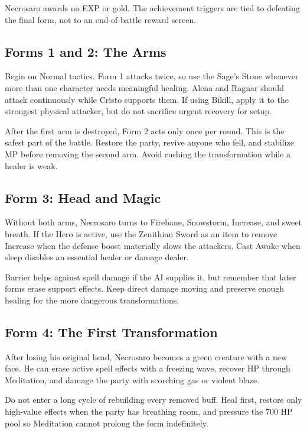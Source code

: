 \documentclass[
  american,
  10pt,
  letterpaper,
  oneside,
  open=any]{scrreprt}
\begin{document}
Necrosaro awards no EXP or gold. The achievement triggers are tied to
defeating the final form, not to an end-of-battle reward screen.

\subsection{Forms 1 and 2: The Arms}\label{forms-1-and-2-the-arms}

Begin on Normal tactics. Form 1 attacks twice, so use the Sage's Stone
whenever more than one character needs meaningful healing. Alena and
Ragnar should attack continuously while Cristo supports them. If using
Bikill, apply it to the strongest physical attacker, but do not
sacrifice urgent recovery for setup.

After the first arm is destroyed, Form 2 acts only once per round. This
is the safest part of the battle. Restore the party, revive anyone who
fell, and stabilize MP before removing the second arm. Avoid rushing the
transformation while a healer is weak.

\subsection{Form 3: Head and Magic}\label{form-3-head-and-magic}

Without both arms, Necrosaro turns to Firebane, Snowstorm, Increase, and
sweet breath. If the Hero is active, use the Zenithian Sword as an item
to remove Increase when the defense boost materially slows the
attackers. Cast Awake when sleep disables an essential healer or damage
dealer.

Barrier helps against spell damage if the AI supplies it, but remember
that later forms erase support effects. Keep direct damage moving and
preserve enough healing for the more dangerous transformations.

\subsection{Form 4: The First
Transformation}\label{form-4-the-first-transformation}

After losing his original head, Necrosaro becomes a green creature with
a new face. He can erase active spell effects with a freezing wave,
recover HP through Meditation, and damage the party with scorching gas
or violent blaze.

Do not enter a long cycle of rebuilding every removed buff. Heal first,
restore only high-value effects when the party has breathing room, and
pressure the 700 HP pool so Meditation cannot prolong the form
indefinitely.
\end{document}
